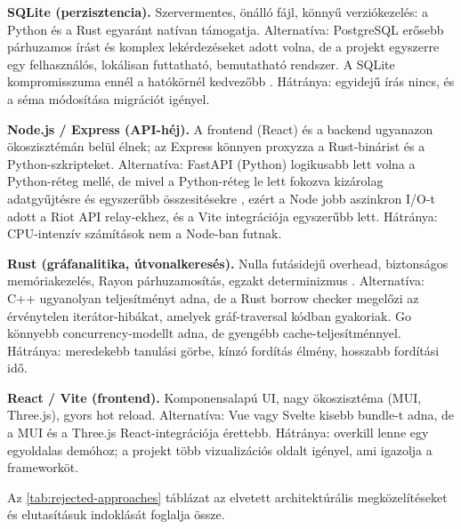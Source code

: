 \textbf{SQLite (perzisztencia).} Szervermentes, önálló fájl, könnyű verziókezelés: a Python és a Rust egyaránt natívan támogatja. Alternatíva: PostgreSQL erősebb párhuzamos írást és komplex lekérdezéseket adott volna, de a projekt egyszerre egy felhasználós, lokálisan futtatható, bemutatható rendszer. A SQLite kompromisszuma ennél a hatókörnél kedvezőbb \cite{sqlite}. Hátránya: egyidejű írás nincs, és a séma módosítása migrációt igényel.

\textbf{Node.js / Express (API-héj).} A frontend (React) és a backend ugyanazon ökoszisztémán belül élnek; az Express könnyen proxyzza a Rust-binárist és a Python-szkripteket. Alternatíva: FastAPI (Python) logikusabb lett volna a Python-réteg mellé, de mivel a Python-réteg le lett fokozva kizárolag adatgyűjtésre és egyszerűbb összesitésekre , ezért a Node jobb aszinkron I/O-t adott a Riot API relay-ekhez, és a Vite integrációja egyszerűbb lett. Hátránya: CPU-intenzív számítások nem a Node-ban futnak.

\textbf{Rust (gráfanalitika, útvonalkeresés).} Nulla futásidejű overhead, biztonságos memóriakezelés, Rayon párhuzamosítás, egzakt determinizmus \cite{jung2020,rustlang}. Alternatíva: C++ ugyanolyan teljesítményt adna, de a Rust borrow checker megelőzi az érvénytelen iterátor-hibákat, amelyek gráf-traversal kódban gyakoriak. Go könnyebb concurrency-modellt adna, de gyengébb cache-teljesítménnyel. Hátránya: meredekebb tanulási görbe, kínzó fordítás élmény, hosszabb fordítási idő.

\textbf{React / Vite (frontend).} Komponensalapú UI, nagy ökoszisztéma (MUI, Three.js), gyors hot reload. Alternatíva: Vue vagy Svelte kisebb bundle-t adna, de a MUI és a Three.js React-integrációja érettebb. Hátránya: overkill lenne egy egyoldalas demóhoz; a projekt több vizualizációs oldalt igényel, ami igazolja a frameworköt.

Az \ref{tab:rejected-approaches} táblázat az elvetett architektúrális megközelítéseket és elutasításuk indoklását foglalja össze.

